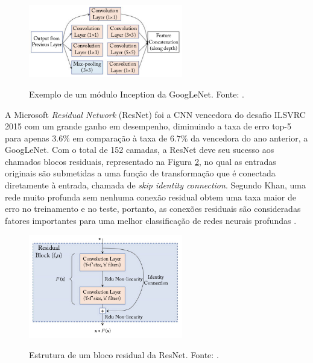 \begin{figure}[h!]
  \centering
  \caption{Exemplo de um módulo Inception da GoogLeNet. Fonte: \cite{khan}.}
  \includegraphics[width=0.6\textwidth]{imgs/inception-module}
  \label{fig:inception-module}
\end{figure}

A Microsoft \emph{Residual Network} (ResNet) foi a CNN vencedora do desafio ILSVRC 2015 com um grande ganho em desempenho, diminuindo a taxa de erro top-5 para apenas $3.6\%$ em comparação à taxa de $6.7\%$ da vencedora do ano anterior, a GoogLeNet. Com o total de 152 camadas, a ResNet deve seu sucesso aos chamados blocos residuais, representado na Figura \ref{fig:residual-block}, no qual as entradas originais são submetidas a uma função de transformação que é conectada diretamente à entrada, chamada de \emph{skip identity connection}. Segundo Khan, uma rede muito profunda sem nenhuma conexão residual obtem uma taxa maior de erro no treinamento e no teste, portanto, as conexões residuais são consideradas fatores importantes para uma melhor classificação de redes neurais profundas \cite{khan}.

\begin{figure}[h!]
  \centering
  \caption{Estrutura de um bloco residual da ResNet. Fonte: \cite{khan}.}
  \includegraphics[width=0.6\textwidth]{imgs/residual-block}
  \label{fig:residual-block}
\end{figure}
